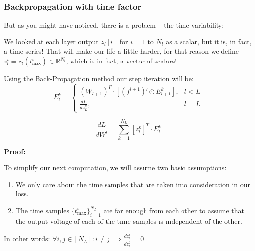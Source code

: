 \subsubsection{Backpropagation with time factor}

But as you might have noticed, there is a problem – the time variability:

We looked at each layer output \(z_l[i]\) for \(i=1\) to \(N_l\) as a scalar, but it is, in fact, a time series!
That will make our life a little harder, for that reason we define \(z_l^i = z_l(t_{\text{max}}^i) \in \mathbb{R}^{N_l}\), which is in fact, a vector of scalars!

\begin{mdframed}[backgroundcolor=red_background, linecolor=black, linewidth=2pt, frametitle=\textbf{Statement}]
\begin{center}

    \label{st:BP-cross-entr-time-tempotron}
    Using the Back-Propagation method our step iteration will be:
    \begin{equation}
        E_l^k = \begin{cases} (W_{l+1})^T \cdot [(f^{l+1})' \odot E_{l+1}^k], & l < L \\ \frac{dL}{dz_L^k}, & l = L \end{cases}
    \end{equation}

    \begin{equation}
        \frac{dL}{dW^l} = \sum_{k=1}^{N_L} [z_l^k]^T \cdot E_l^k
    \end{equation}

\end{center}
\end{mdframed}

\textbf{Proof:}

To simplify our next computation, we will assume two basic assumptions:
\begin{enumerate}
    \item We only care about the time samples that are taken into consideration in our loss.

    \item The time samples \(\{t_{\text{max}}^i\}_{i=1}^{N_L}\) are far enough from each other to assume that the output voltage of each of the time samples is independent of the other.
\end{enumerate}

In other words: \(\forall i,j \in [N_L]: i \neq j \implies \frac{dz_l^i}{dz_l^j} = 0\)

